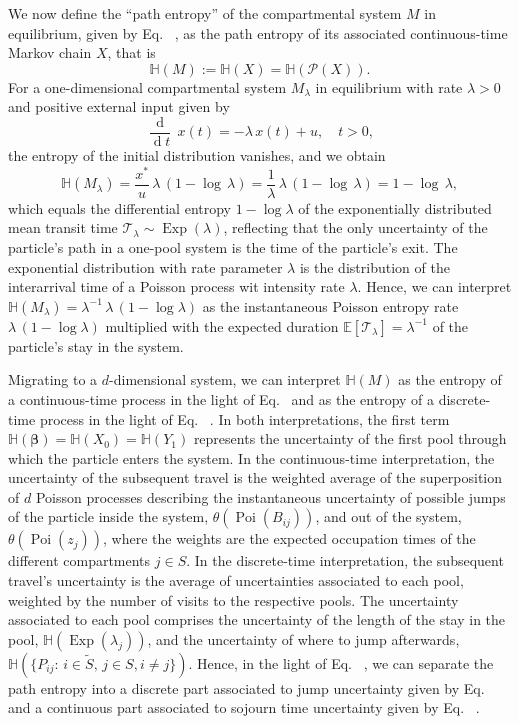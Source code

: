 \documentclass[smallextended]{svjour3}
\makeatletter
\renewcommand*{\eqref}[1]{%
  \hyperref[{#1}]{\textup{\tagform@{\ref*{#1}}}}%
}
\renewcommand{\vec}[1]{\mathbf{#1}}
\newcommand{\E}{\mathbb{E}}
\newcommand{\TT}{\mathcal{T}}
\renewcommand{\H}{\mathbb{H}}
\newcommand{\Exp}{\operatorname{Exp}}
\newcommand{\Poi}{\operatorname{Poi}}
\newcommand{\deriv}[1]{\frac{\operatorname{d}}{\operatorname{d}#1}}
\newcommand{\ie}{that is}
\renewcommand{\emph}[1]{``#1''}
\makeatother
\begin{document}
We now define the \emph{path entropy} of the compartmental system $M$ in equilibrium, given by Eq.~\eqref{eqn:lin_CS_sys}, as the path entropy of its associated continuous-time Markov chain $X$, \ie
\begin{equation}
  \H(M):=\H(X)=\H(\mathcal{P}(X)).
\end{equation}
For a one-dimensional compartmental system $M_\lambda$ in equilibrium with rate $\lambda>0$ and positive external input given by
\begin{equation}
  \deriv{t}\,x(t) = -\lambda\,x(t) + u,\quad t>0,
\end{equation}
the entropy of the initial distribution vanishes, and we obtain
\begin{equation}
  \H(M_\lambda) = \frac{x^\ast}{u}\,\lambda\,(1-\log\,\lambda) = \frac{1}{\lambda}\,\lambda\,(1-\log\,\lambda) = 1-\log\,\lambda,
\end{equation}  
which equals the differential entropy $1-\log\lambda$ of the exponentially distributed mean transit time $\TT_\lambda\sim\Exp(\lambda)$, reflecting that the only uncertainty of the particle's path in a one-pool system is the time of the particle's exit.
The exponential distribution with rate parameter $\lambda$ is the distribution of the interarrival time of a Poisson process wit intensity rate $\lambda$.
Hence, we can interpret $\H(M_\lambda) = \lambda^{-1}\,\lambda\,(1-\log\lambda)$ as the instantaneous Poisson entropy rate $\lambda\,(1-\log\lambda)$ multiplied with the expected duration $\E\left[\TT_{\lambda}\right]=\lambda^{-1}$ of the particle's stay in the system.

Migrating to a $d$-dimensional system, we can interpret $\H(M)$ as the entropy of a continuous-time process in the light of Eq.~\eqref{eqn:H_occupation_time} and as the entropy of a discrete-time process in the light of Eq.~\eqref{eqn:H_number_of_visits}.
In both interpretations, the first term $\H(\vec{\beta})=\H(X_0)=\H(Y_1)$ represents the uncertainty of the first pool through which the particle enters the system.
In the continuous-time interpretation, the uncertainty of the subsequent travel is the weighted average of the superposition of $d$ Poisson processes describing the instantaneous uncertainty of possible jumps of the particle inside the system, $\theta(\Poi(B_{ij}))$, and out of the system, $\theta(\Poi(z_j))$, where the weights are the expected occupation times of the different compartments $j\in S$. 
In the discrete-time interpretation, the subsequent travel's uncertainty is the average of uncertainties associated to each pool, weighted by the number of visits to the respective pools.
The uncertainty associated to each pool comprises the uncertainty of the length of the stay in the pool, $\H(\Exp(\lambda_j))$, and the uncertainty of where to jump afterwards, $\H(\{P_{ij}:\,i\in\widetilde{S},\,j\in S,i\neq j\})$.
Hence, in the light of Eq.~\eqref{eqn:H_number_of_visits}, we can separate the path entropy into a discrete part associated to jump uncertainty given by Eq.~\eqref{eqn:H_discrete} and a continuous part associated to sojourn time uncertainty given by Eq.~\eqref{eqn:H_continuous}.
\end{document}

